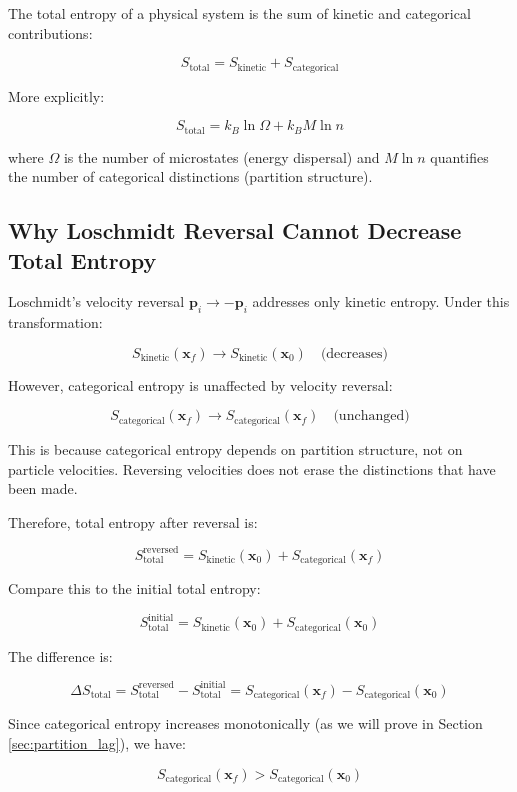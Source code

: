 \documentclass[twocolumn,10pt]{article}
\theoremstyle{definition}
\theoremstyle{remark}
\begin{document}
The total entropy of a physical system is the sum of kinetic and categorical contributions:

$$
S_{\text{total}} = S_{\text{kinetic}} + S_{\text{categorical}}
$$

More explicitly:

$$
S_{\text{total}} = k_B \ln \Omega + k_B M \ln n
$$

where $\Omega$ is the number of microstates (energy dispersal) and $M \ln n$ quantifies the number of categorical distinctions (partition structure).

\subsection{Why Loschmidt Reversal Cannot Decrease Total Entropy}

Loschmidt's velocity reversal $\mathbf{p}_i \to -\mathbf{p}_i$ addresses only kinetic entropy. Under this transformation:

$$
S_{\text{kinetic}}(\mathbf{x}_f) \to S_{\text{kinetic}}(\mathbf{x}_0) \quad \text{(decreases)}
$$

However, categorical entropy is unaffected by velocity reversal:

$$
S_{\text{categorical}}(\mathbf{x}_f) \to S_{\text{categorical}}(\mathbf{x}_f) \quad \text{(unchanged)}
$$

This is because categorical entropy depends on partition structure, not on particle velocities. Reversing velocities does not erase the distinctions that have been made.

Therefore, total entropy after reversal is:

$$
S_{\text{total}}^{\text{reversed}} = S_{\text{kinetic}}(\mathbf{x}_0) + S_{\text{categorical}}(\mathbf{x}_f)
$$

Compare this to the initial total entropy:

$$
S_{\text{total}}^{\text{initial}} = S_{\text{kinetic}}(\mathbf{x}_0) + S_{\text{categorical}}(\mathbf{x}_0)
$$

The difference is:

$$
\Delta S_{\text{total}} = S_{\text{total}}^{\text{reversed}} - S_{\text{total}}^{\text{initial}} = S_{\text{categorical}}(\mathbf{x}_f) - S_{\text{categorical}}(\mathbf{x}_0)
$$

Since categorical entropy increases monotonically (as we will prove in Section \ref{sec:partition_lag}), we have:

$$
S_{\text{categorical}}(\mathbf{x}_f) > S_{\text{categorical}}(\mathbf{x}_0)
$$
\end{document}
